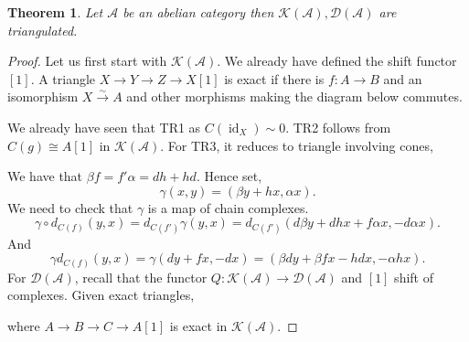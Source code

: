 \documentclass[10pt]{article}
\numberwithin{equation}{section}
\newtheorem{theorem}{Theorem} [section]
\DeclareMathOperator{\id}{id}
\newcommand{\cK}[0]{\mathcal{K}}
\newcommand{\cD}[0]{\mathcal{D}}
\newcommand{\sA}[0]{\mathscr{A}}
\begin{document}
\begin{theorem}
    Let $\sA$ be an abelian category then $\cK(\sA),\cD(\sA)$ are triangulated.
\end{theorem}

\begin{proof}
    Let us first start with $\cK(\sA)$. We already have defined the shift functor $[1]$. A triangle $X\to Y\to Z\to X[1]$ is exact if there is $f:A\to B$ and an isomorphism $X\stackrel{\sim}{\to}A$ and other morphisms making the diagram below commutes.
    \begin{center}
    \end{center}
    We already have seen that TR1 as $C(\id_X)\sim 0$. TR2 follows from $C(g)\cong A[1]$ in $\cK(\sA)$. For TR3, it reduces to triangle involving cones, 
    \begin{center}
    \end{center}
    We have that $\beta f = f'\alpha = dh+hd$. Hence set,
    \begin{equation*}
        \gamma(x,y) = (\beta y+hx,\alpha x).
    \end{equation*}
    We need to check that $\gamma$ is a map of chain complexes. 
    \begin{equation*}
        \gamma\circ d_{C(f)}(y,x) = d_{C(f')}\gamma(y,x) = d_{C(f')}(d\beta y+dhx+f\alpha x,-d\alpha x).
    \end{equation*}
    And 
    \begin{equation*}
        \gamma d_{C(f)}(y,x) = \gamma(dy+fx,-dx) = (\beta dy+\beta fx-hdx,-\alpha hx).
    \end{equation*}
    For $\cD(\sA)$, recall that the functor $Q:\cK(\sA)\to \cD(\sA)$ and $[1]$ shift of complexes. Given exact triangles,
    \begin{center}
    \end{center}
    where $A\to B\to C\to A[1]$ is exact in $\cK(\sA)$.
\end{proof}
\end{document}
